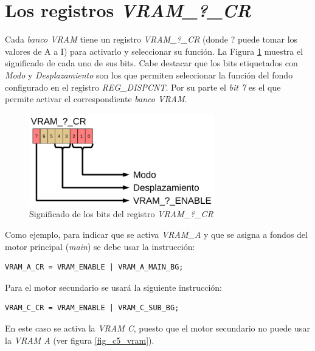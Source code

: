 \section{Los registros \textit{VRAM\_?\_CR}} 
Cada \textit{banco VRAM} tiene un registro \textit{VRAM\_?\_CR} (donde ? puede tomar los valores de A a I) para activarlo y seleccionar su función. La Figura \ref{fig_c5_reg_vram1} muestra el significado de cada uno de sus bits. Cabe destacar que los bits etiquetados con \textit{Modo} y \textit{Desplazamiento} son los que permiten seleccionar la función del fondo configurado en el registro \textit{REG\_DISPCNT}. Por su parte el \textit{bit 7} es el que permite activar el correspondiente \textit{banco VRAM}.

\begin{figure}[!t]
\centering
\includegraphics[height=4cm]{Figuras/C5/c5_reg_vram1.png}
\caption{Significado de los bits del registro \textit{VRAM\_?\_CR}}
\label{fig_c5_reg_vram1}
\end{figure}

Como ejemplo, para indicar que se activa \textit{VRAM\_A} y que se asigna a fondos del motor principal (\textit{main}) se debe usar la instrucción:

\begin{verbatim}
VRAM_A_CR = VRAM_ENABLE | VRAM_A_MAIN_BG;
\end{verbatim}

Para el motor secundario se usará la siguiente instrucción:

\begin{verbatim}
VRAM_C_CR = VRAM_ENABLE | VRAM_C_SUB_BG;
\end{verbatim}

En este caso se activa la \textit{VRAM C}, puesto que el motor secundario no puede usar la \textit{VRAM A} (ver figura \ref{fig_c5_vram}).
